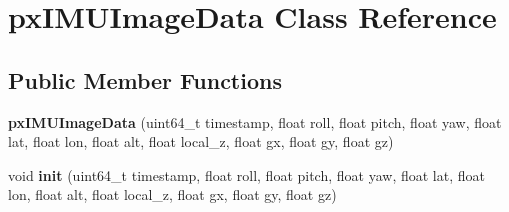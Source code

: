 \hypertarget{classpxIMUImageData}{
\section{pxIMUImageData Class Reference}
\label{classpxIMUImageData}
}
\subsection*{Public Member Functions}
\begin{DoxyCompactItemize}
\item 
\hypertarget{classpxIMUImageData_a1377955ea73687b7896ccd56ee585ead}{
{\bfseries pxIMUImageData} (uint64\_\-t timestamp, float roll, float pitch, float yaw, float lat, float lon, float alt, float local\_\-z, float gx, float gy, float gz)}
\label{classpxIMUImageData_a1377955ea73687b7896ccd56ee585ead}

\item 
\hypertarget{classpxIMUImageData_a3ddc7018c1288d409d294e5bb1c99626}{
void {\bfseries init} (uint64\_\-t timestamp, float roll, float pitch, float yaw, float lat, float lon, float alt, float local\_\-z, float gx, float gy, float gz)}
\label{classpxIMUImageData_a3ddc7018c1288d409d294e5bb1c99626}

\end{DoxyCompactItemize}

